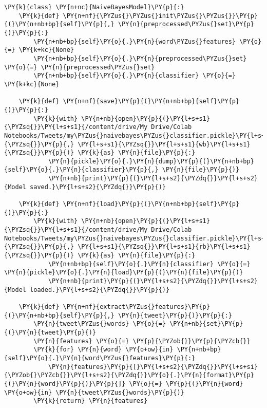     \begin{tcolorbox}[breakable, size=fbox, boxrule=1pt, pad at break*=1mm,colback=cellbackground, colframe=cellborder]
\begin{Verbatim}[commandchars=\\\{\}]
\PY{k}{class} \PY{n+nc}{NaiveBayesModel}\PY{p}{:}
    \PY{k}{def} \PY{n+nf}{\PYZus{}\PYZus{}init\PYZus{}\PYZus{}}\PY{p}{(}\PY{n+nb+bp}{self}\PY{p}{,} \PY{n}{preprocessed\PYZus{}set}\PY{p}{)}\PY{p}{:}
        \PY{n+nb+bp}{self}\PY{o}{.}\PY{n}{word\PYZus{}features} \PY{o}{=} \PY{k+kc}{None}
        \PY{n+nb+bp}{self}\PY{o}{.}\PY{n}{preprocessed\PYZus{}set} \PY{o}{=} \PY{n}{preprocessed\PYZus{}set}
        \PY{n+nb+bp}{self}\PY{o}{.}\PY{n}{classifier} \PY{o}{=} \PY{k+kc}{None}

    \PY{k}{def} \PY{n+nf}{save}\PY{p}{(}\PY{n+nb+bp}{self}\PY{p}{)}\PY{p}{:}
        \PY{k}{with} \PY{n+nb}{open}\PY{p}{(}\PY{l+s+s1}{\PYZsq{}}\PY{l+s+s1}{/content/drive/My Drive/Colab Notebooks/Tweets/my\PYZus{}naivebayes\PYZus{}classifier.pickle}\PY{l+s+s1}{\PYZsq{}}\PY{p}{,} \PY{l+s+s1}{\PYZsq{}}\PY{l+s+s1}{wb}\PY{l+s+s1}{\PYZsq{}}\PY{p}{)} \PY{k}{as} \PY{n}{file}\PY{p}{:}
            \PY{n}{pickle}\PY{o}{.}\PY{n}{dump}\PY{p}{(}\PY{n+nb+bp}{self}\PY{o}{.}\PY{n}{classifier}\PY{p}{,} \PY{n}{file}\PY{p}{)}
            \PY{n+nb}{print}\PY{p}{(}\PY{l+s+s2}{\PYZdq{}}\PY{l+s+s2}{Model saved.}\PY{l+s+s2}{\PYZdq{}}\PY{p}{)}

    \PY{k}{def} \PY{n+nf}{load}\PY{p}{(}\PY{n+nb+bp}{self}\PY{p}{)}\PY{p}{:}
        \PY{k}{with} \PY{n+nb}{open}\PY{p}{(}\PY{l+s+s1}{\PYZsq{}}\PY{l+s+s1}{/content/drive/My Drive/Colab Notebooks/Tweets/my\PYZus{}naivebayes\PYZus{}classifier.pickle}\PY{l+s+s1}{\PYZsq{}}\PY{p}{,} \PY{l+s+s1}{\PYZsq{}}\PY{l+s+s1}{rb}\PY{l+s+s1}{\PYZsq{}}\PY{p}{)} \PY{k}{as} \PY{n}{file}\PY{p}{:}
            \PY{n+nb+bp}{self}\PY{o}{.}\PY{n}{classifier} \PY{o}{=} \PY{n}{pickle}\PY{o}{.}\PY{n}{load}\PY{p}{(}\PY{n}{file}\PY{p}{)}
            \PY{n+nb}{print}\PY{p}{(}\PY{l+s+s2}{\PYZdq{}}\PY{l+s+s2}{Model loaded.}\PY{l+s+s2}{\PYZdq{}}\PY{p}{)}

    \PY{k}{def} \PY{n+nf}{extract\PYZus{}features}\PY{p}{(}\PY{n+nb+bp}{self}\PY{p}{,} \PY{n}{tweet}\PY{p}{)}\PY{p}{:}
        \PY{n}{tweet\PYZus{}words} \PY{o}{=} \PY{n+nb}{set}\PY{p}{(}\PY{n}{tweet}\PY{p}{)}
        \PY{n}{features} \PY{o}{=} \PY{p}{\PYZob{}}\PY{p}{\PYZcb{}}
        \PY{k}{for} \PY{n}{word} \PY{o+ow}{in} \PY{n+nb+bp}{self}\PY{o}{.}\PY{n}{word\PYZus{}features}\PY{p}{:}
            \PY{n}{features}\PY{p}{[}\PY{l+s+s2}{\PYZdq{}}\PY{l+s+si}{\PYZob{}\PYZcb{}}\PY{l+s+s2}{\PYZdq{}}\PY{o}{.}\PY{n}{format}\PY{p}{(}\PY{n}{word}\PY{p}{)}\PY{p}{]} \PY{o}{=} \PY{p}{(}\PY{n}{word} \PY{o+ow}{in} \PY{n}{tweet\PYZus{}words}\PY{p}{)}
        \PY{k}{return} \PY{n}{features}


\end{Verbatim}
\end{tcolorbox}
